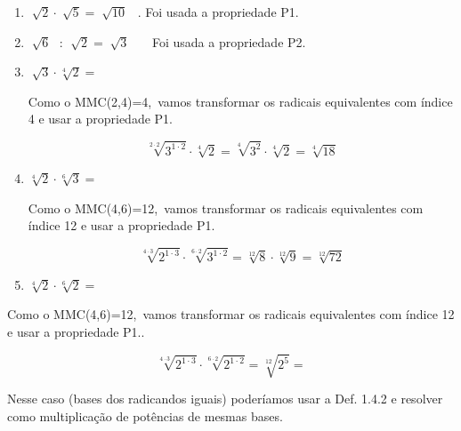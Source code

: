 \documentclass[12pt]{article}
\renewcommand{\_}{\kern-1.5pt\textunderscore\kern-1.5pt}
\begin{document}
\begin{enumerate}
	\item  \( \sqrt[]{2} \cdot \sqrt[]{5}=\sqrt[]{10} \) \  . Foi usada a propriedade P1.\par

	\item  \( \sqrt[]{6}\text{~ : }\sqrt[]{2}=\sqrt[]{3} \) \ \ \  Foi usada a propriedade P2.\par

	\item  \( \sqrt[]{3} \cdot \sqrt[4]{2}= \) \par

Como o MMC(2,4)=4,\ vamos transformar os radicais equivalentes com índice  4 e usar a propriedade P1.\par

 \[ \sqrt[2 \cdot 2]{3^{1 \cdot 2}} \cdot \sqrt[4]{2}=\sqrt[4]{3^{2}} \cdot \sqrt[4]{2}=\sqrt[4]{18} \] \par

	\item  \( \sqrt[4]{2} \cdot \sqrt[6]{3}= \) \par

Como o MMC(4,6)=12,\ vamos transformar os radicais equivalentes com índice  12 e usar a propriedade P1.\par

 \[ \sqrt[4 \cdot 3]{2^{1 \cdot 3}} \cdot \sqrt[6 \cdot 2]{3^{1 \cdot 2}}=\sqrt[12]{8} \cdot \sqrt[12]{9}=\sqrt[12]{72} \] \par

	\item  \( \sqrt[4]{2} \cdot \sqrt[6]{2}= \) 
\end{enumerate}\par

\begin{adjustwidth}{0.59in}{0.0in}
Como o MMC(4,6)=12,\ vamos transformar os radicais equivalentes com índice  12 e usar a propriedade P1..\par

\end{adjustwidth}

\begin{adjustwidth}{0.59in}{0.0in}
 \[ \sqrt[4 \cdot 3]{2^{1 \cdot 3}} \cdot \sqrt[6 \cdot 2]{2^{1 \cdot 2}}=\sqrt[12]{2^{5}}= \] \par

\end{adjustwidth}

\begin{adjustwidth}{0.59in}{0.0in}
Nesse caso (bases dos radicandos iguais) poderíamos usar a Def. 1.4.2 e resolver como multiplicação de potências de mesmas bases.\par

\end{adjustwidth}
\end{document}

